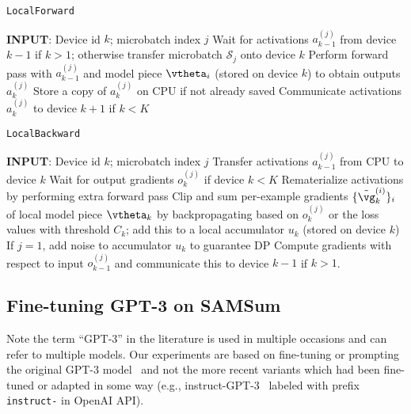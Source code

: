 \begin{minipage}{0.46\textwidth}
\begin{algorithm}[H]
    \centering
    \caption{ \texttt{LocalForward} }
    \begin{algorithmic}[1]
        \STATE \textbf{INPUT}: Device id $k$; microbatch index $j$ 
        \STATE Wait for activations $a_{k-1}^{(j)}$ from device $k-1$ if $k > 1$; otherwise transfer microbatch $\mathcal{S}_j$ onto device $k$
        \STATE Perform forward pass with $a_{k-1}^{(j)}$ and model piece $\vtheta_i$ (stored on device $k$) to obtain outputs $a_{k}^{(j)}$
        \STATE Store a copy of $a_{k}^{(j)}$ on CPU if not already saved
        \STATE Communicate activations $a_{k}^{(j)}$ to device $k+1$ if $k < K$
    \end{algorithmic}
\end{algorithm}
\end{minipage}
\hfill
\begin{minipage}{0.46\textwidth}
\begin{algorithm}[H]
    \centering
    \caption{ \texttt{LocalBackward} }
    \begin{algorithmic}[1]
        \STATE \textbf{INPUT}: Device id $k$; microbatch index $j$
        \STATE Transfer activations $a_{k-1}^{(j)}$ from CPU to device $k$
        \STATE Wait for output gradients $o_{k}^{(j)}$ if device $k < K$
        \STATE Rematerialize activations by performing extra forward pass
        \STATE Clip and sum per-example gradients $\{ \tilde{\vg}_k^{(i)} \}_i$ of local model piece $\vtheta_k$ by backpropagating based on $o_{k}^{(j)}$ or the loss values with threshold $C_k$; add this to a local accumulator $u_k$ (stored on device $k$)
        \STATE If $j=1$, add noise to accumulator $u_k$ to guarantee DP
        \STATE Compute gradients with respect to input $o_{k-1}^{(j)}$ and communicate this to device $k-1$ if $k > 1$. 
    \end{algorithmic}
\end{algorithm}
\end{minipage}



\subsection{Fine-tuning GPT-3 on SAMSum}
Note the term ``GPT-3'' in the literature is used in multiple occasions and can refer to multiple models. 
Our experiments are based on fine-tuning or prompting the original GPT-3 model~\citep{brown2020language} and not the more recent variants which had been fine-tuned or adapted in some way (e.g., instruct-GPT-3~\citep{ouyang2022training} labeled with prefix \texttt{instruct-} in OpenAI API). 



